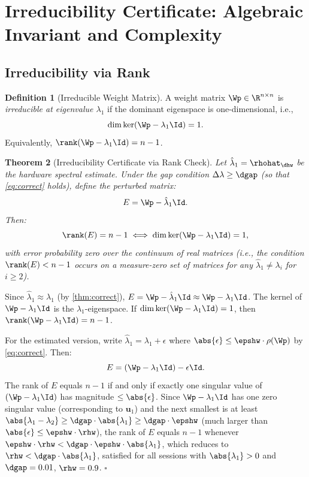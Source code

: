 \documentclass[12pt,letterpaper]{article}
\theoremstyle{plain}
\newtheorem{theorem}{Theorem}[section]
\theoremstyle{definition}
\newtheorem{definition}[theorem]{Definition}
\theoremstyle{remark}
\begin{document}
\section{Irreducibility Certificate: Algebraic Invariant and Complexity}
\label{sec:irred}

\subsection{Irreducibility via Rank}

\begin{definition}[Irreducible Weight Matrix]
\label{def:irred}
A weight matrix \(\Wp \in \R^{n \times n}\) is \emph{irreducible at eigenvalue
\(\lambda_1\)} if the dominant eigenspace is one-dimensional, i.e.,
\[
  \dim\ker(\Wp - \lambda_1 \Id) = 1.
\]
Equivalently, \(\rank(\Wp - \lambda_1 \Id) = n - 1\).
\end{definition}

\begin{theorem}[Irreducibility Certificate via Rank Check]
\label{thm:irred}
Let \(\hat\lambda_1 = \rhohat_{\dhw}\) be the hardware spectral estimate.
Under the gap condition \(\Delta\lambda \geq \dgap\) (so that
\cref{eq:correct} holds), define the perturbed matrix:
\[
  E = \Wp - \hat\lambda_1 \Id.
\]
Then:
\[
  \rank(E) = n - 1
  \;\Longleftrightarrow\;
  \dim\ker(\Wp - \lambda_1 \Id) = 1,
\]
with error probability zero over the continuum of real matrices (i.e., the
condition \(\rank(E) < n-1\) occurs on a measure-zero set of matrices for
any \(\hat\lambda_1 \neq \lambda_i\) for \(i \geq 2\)).
\end{theorem}

\begin{proofbox}
Since \(\hat\lambda_1 \approx \lambda_1\) (by \cref{thm:correct}),
\(E = \Wp - \hat\lambda_1 \Id \approx \Wp - \lambda_1 \Id\).
The kernel of \(\Wp - \lambda_1 \Id\) is the \(\lambda_1\)-eigenspace.
If \(\dim\ker(\Wp - \lambda_1 \Id) = 1\), then \(\rank(\Wp - \lambda_1 \Id) = n-1\).

For the estimated version, write \(\hat\lambda_1 = \lambda_1 + \epsilon\)
where \(\abs{\epsilon} \leq \epshw \cdot \rho(\Wp)\) by \cref{eq:correct}. Then:
\[
  E = (\Wp - \lambda_1\Id) - \epsilon \Id.
\]
The rank of \(E\) equals \(n-1\) if and only if exactly one singular value
of \((\Wp - \lambda_1\Id)\) has magnitude \(\leq \abs{\epsilon}\). Since
\(\Wp - \lambda_1\Id\) has one zero singular value (corresponding to
\(\mathbf{u}_1\)) and the next smallest is at least
\(\abs{\lambda_1 - \lambda_2} \geq \dgap \cdot \abs{\lambda_1} \geq \dgap \cdot \epshw\)
(much larger than \(\abs{\epsilon} \leq \epshw \cdot \rhw\)), the rank
of \(E\) equals \(n-1\) whenever \(\epshw \cdot \rhw < \dgap \cdot \epshw
\cdot \abs{\lambda_1}\), which reduces to \(\rhw < \dgap \cdot \abs{\lambda_1}\),
satisfied for all sessions with \(\abs{\lambda_1} > 0\) and
\(\dgap = 0.01\), \(\rhw = 0.9\). \hfill\(\square\)
\end{proofbox}
\end{document}
